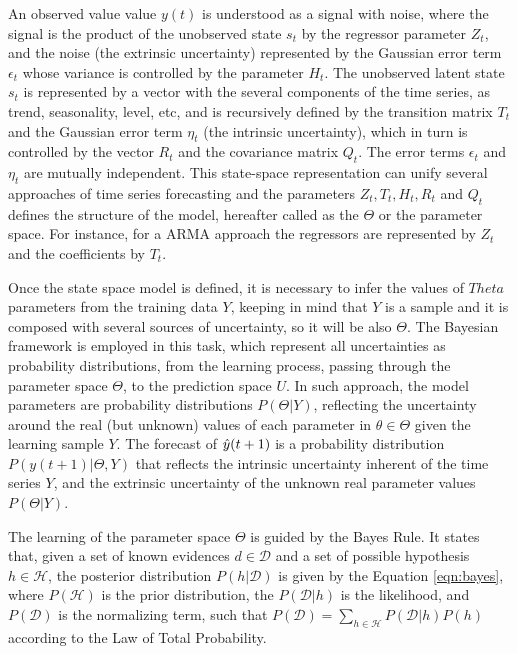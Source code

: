 An observed value value $y(t)$ is understood as a signal with noise, where the signal is the product of the unobserved state $s_t$ by the regressor parameter $Z_t$, and the noise (the extrinsic uncertainty) represented by the Gaussian error term $\epsilon_t$ whose variance is controlled by the parameter $H_t$. The unobserved latent state $s_t$ is represented by a vector with the several components of the time series, as trend, seasonality, level, etc, and is recursively defined by the transition matrix $T_t$ and the Gaussian error term $\eta_t$ (the intrinsic uncertainty), which in turn is controlled by the vector $R_t$ and the covariance matrix $Q_t$. The error terms $\epsilon_t$ and $\eta_t$ are mutually independent. This state-space representation can unify several approaches of time series forecasting and the parameters $Z_t,T_t,H_t,R_t$ and $Q_t$ defines the structure of the model, hereafter called as the $\Theta$ or the parameter space. For instance, for a ARMA approach the regressors are represented by $Z_t$ and the coefficients by $T_t$. 

Once the state space model is defined, it is necessary to infer the values of $Theta$ parameters from the training data $Y$, keeping in mind that $Y$ is a sample and it is composed with several sources of uncertainty, so it will be also $\Theta$. The Bayesian framework is employed in this task, which represent all uncertainties as probability distributions, from the learning process, passing through the parameter space $\Theta$, to the prediction space $U$. In such approach, the model parameters are probability distributions $P(\Theta|Y)$, reflecting the uncertainty around the real (but unknown) values of each parameter in $\theta \in \Theta$ given the learning sample $Y$. The forecast of $\hat{y}(t+1)$ is a probability distribution $P(y(t+1)|\Theta,Y)$ that reflects the intrinsic uncertainty inherent of the time series $Y$, and the extrinsic uncertainty of the unknown real parameter values $P(\Theta|Y)$. 

The learning of the parameter space $\Theta$ is guided by the Bayes Rule. It states that, given a set of known evidences $d \in \mathcal{D}$ and a set of possible hypothesis $h \in \mathcal{H}$, the posterior distribution $P(h|\mathcal{D})$ is given by the Equation \ref{eqn:bayes}, where $P(\mathcal{H})$ is the prior distribution, the $P(\mathcal{D}|h)$ is the likelihood, and $P(\mathcal{D})$ is the normalizing term, such that $P(\mathcal{D}) = \sum_{h \in \mathcal{H}}P(\mathcal{D}|h)P(h)$ according to the Law of Total Probability. 

